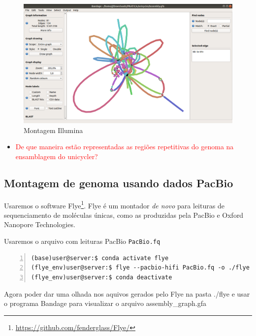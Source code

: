 \documentclass[letter,11pt]{book}
\begin{document}
\begin{figure}[ht]
\centering
   \includegraphics[width=12cm]{Figs/bandage.png}
  \caption[Visualização da montagem do unicycler]{\label{bandage}Montagem Illumina}
\end{figure}

\begin{itemize}
\item \textcolor{red}{De que maneira estão representadas as regiões repetitivas do genoma na ensamblagem do unicycler?}
\end{itemize}

\subsection{Montagem de genoma usando dados PacBio}
Usaremos o software Flye\footnote{\url{https://github.com/fenderglass/Flye/}}. Flye é um montador \emph{de novo} para leituras de sequenciamento de moléculas únicas, como as produzidas pela PacBio e Oxford Nanopore Technologies.

Usaremos o arquivo com leituras PacBio \Verb+PacBio.fq+

\begin{Verbatim}[commandchars=!\{\}, numbers=left,label= Montando leituras com Flye,frame=topline,fontsize=\scriptsize]
(base)user@server:$ conda activate flye
(flye_env)user@server:$ flye --pacbio-hifi PacBio.fq -o ./flye
(flye_env)user@server:$ conda deactivate
\end{Verbatim}

Agora poder dar uma olhada nos aquivos gerados pelo Flye na pasta ./flye e usar o programa Bandage para visualizar o arquivo assembly\_graph.gfa
\end{document}

